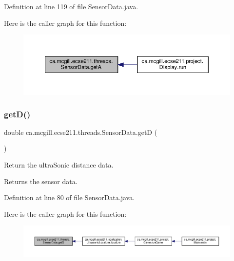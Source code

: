 Definition at line 119 of file Sensor\+Data.\+java.

Here is the caller graph for this function\+:
\nopagebreak
\begin{figure}[H]
\begin{center}
\leavevmode
\includegraphics[width=350pt]{classca_1_1mcgill_1_1ecse211_1_1threads_1_1_sensor_data_acc8f6cc56f39c8ea6b812cd8b135eca6_icgraph}
\end{center}
\end{figure}
\mbox{\label{classca_1_1mcgill_1_1ecse211_1_1threads_1_1_sensor_data_a46cc30522719018a80f89624e0ce458f}} 
\subsubsection{\texorpdfstring{get\+D()}{getD()}}
{\footnotesize\ttfamily double ca.\+mcgill.\+ecse211.\+threads.\+Sensor\+Data.\+getD (\begin{DoxyParamCaption}{ }\end{DoxyParamCaption})}

Return the ultra\+Sonic distance data.

\begin{DoxyReturn}{Returns}
the sensor data. 
\end{DoxyReturn}


Definition at line 80 of file Sensor\+Data.\+java.

Here is the caller graph for this function\+:
\nopagebreak
\begin{figure}[H]
\begin{center}
\leavevmode
\includegraphics[width=350pt]{classca_1_1mcgill_1_1ecse211_1_1threads_1_1_sensor_data_a46cc30522719018a80f89624e0ce458f_icgraph}
\end{center}
\end{figure}
\mbox{\label{classca_1_1mcgill_1_1ecse211_1_1threads_1_1_sensor_data_a39eec50582f0e4bcff8a4669c48e1609}} 
